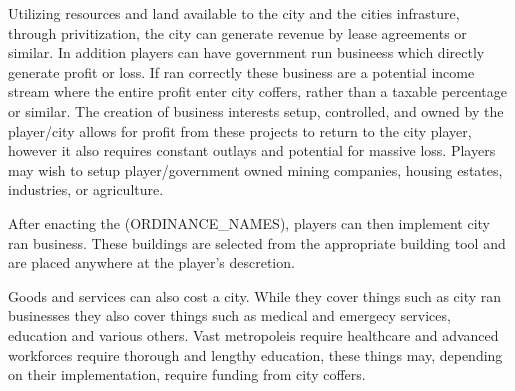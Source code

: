 Utilizing resources and land available to the city and the cities infrasture, through privitization, the city can generate revenue by lease agreements or similar. In addition players can have government run busineess which directly generate profit or loss. If ran correctly these business are a potential income stream where the entire profit enter city coffers, rather than a taxable percentage or similar. 
The creation of business interests setup, controlled, and owned by the player/city allows for profit from these projects to return to the city player, however it also requires constant outlays and potential for massive loss. Players may wish to setup player/government owned mining companies, housing estates, industries, or agriculture. 

After enacting the (ORDINANCE_NAMES), players can then implement city ran business. These buildings are selected from the appropriate building tool and are placed anywhere at the player's descretion.





Goods and services can also cost a city. While they cover things such as city ran businesses they also cover things such as medical and emergecy services, education and various others. Vast metropoleis require healthcare and advanced workforces require thorough and lengthy education, these things may, depending on their implementation, require funding from city coffers.





